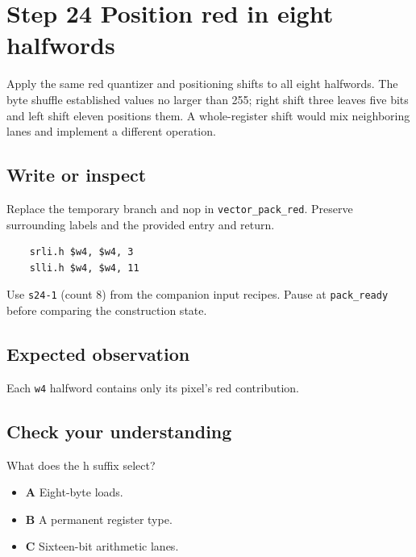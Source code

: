\section{Step 24 Position red in eight halfwords}\label{rgb-s24}

Apply the same red quantizer and positioning shifts to all eight halfwords. The byte shuffle established values no larger than 255; right shift three leaves five bits and left shift eleven positions them. A whole-register shift would mix neighboring lanes and implement a different operation.

\subsection{Write or inspect}
Replace the temporary branch and nop in \texttt{vector\_pack\_red}. Preserve surrounding labels and the provided entry and return.

\begin{verbatim}
    srli.h $w4, $w4, 3
    slli.h $w4, $w4, 11
\end{verbatim}
Use \texttt{s24-1} (count 8) from the companion input recipes. Pause at \texttt{pack\_ready} before comparing the construction state.

\subsection{Expected observation}
Each \texttt{w4} halfword contains only its pixel's red contribution.

\subsection{Check your understanding}
What does the h suffix select?

\begin{itemize}
  \item \textbf{A} Eight-byte loads.
  \item \textbf{B} A permanent register type.
  \item \textbf{C} Sixteen-bit arithmetic lanes.
\end{itemize}
